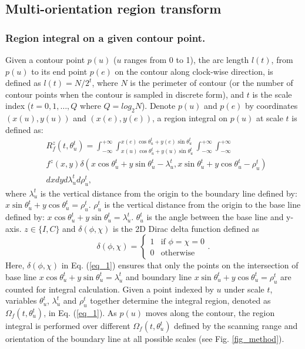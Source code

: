 \documentclass[letterpaper]{article} %
\begin{document}
\subsection{Multi-orientation region transform}
\subsubsection{Region integral on a given contour point.}
Given a contour point $p(u)$ ($u$ ranges from 0 to 1), the arc length $l(t)$, from $p(u)$ to its end point $p(e)$ on the contour along clock-wise direction, is defined as $l(t)=N/2^t$, where $N$ is the perimeter of contour (or the number of contour points when the contour is sampled in discrete form), and $t$ is the scale index ($t=0,1,\dots,Q$ where $Q=log_2 N$). Denote $p(u)$ and $p(e)$ by coordinates $(x(u),y(u))$ and $(x(e),y(e))$, a region integral on $p(u)$ at scale $t$ is defined as:
\begin{equation}
\begin{aligned}
& R_f^z (t,\theta_u^t) 
= \int_{-\infty}^{+\infty}\int_{x(u)\cos\theta_u^t+y(u)\sin\theta_u^t}^{x(e)\cos\theta_u^t+y(e)\sin\theta_u^t}\int_{-\infty}^{+\infty}\int_{-\infty}^{+\infty} \\ & f^z (x,y) \delta{(x\cos\theta_u^t+y\sin\theta_u^t-\lambda_u^t,x\sin\theta_u^t+y\cos\theta_u^t-\rho_u^t)} \\ & dxdyd\lambda_u^t d\rho_u^t,
\end{aligned}
\label{eq_1}
\end{equation}
where $ \lambda^t_u$ is the vertical distance from the origin to the boundary line defined by: $ x\sin \theta^t_u+y\cos \theta^t_u=\rho^t_u$. $\rho^t_u$ is the vertical distance from the origin to the base line defined by: $ x\cos \theta^t_u+y\sin \theta^t_u=\lambda^t_u$. $\theta^t_u$ is the angle between the base line and y-axis.  $z \in \{I,C\}$ and $\delta(\phi,\chi)$ is the 2D Dirac delta function defined as
\begin{equation}
\delta(\phi,\chi)=\begin{cases}
1& \text{if $\phi = \chi = 0 $}\\
0& \text{otherwise}
\end{cases}.
\label{eq_2}
\end{equation}
Here, $\delta(\phi,\chi)$ in Eq. (\ref{eq_1}) ensures that only the points on the intersection of base line $ x\cos \theta^t_u+y\sin \theta^t_u=\lambda^t_u$ and boundary line $ x\sin \theta^t_u+y\cos \theta^t_u=\rho^t_u$ are counted for integral calculation. Given a point indexed by $u$ under scale $t$, variables $\theta^t_u$, $\lambda^t_u$ and $\rho^t_u$ together determine the integral region, denoted as $\Omega_f (t,\theta_u^t )$, in Eq. (\ref{eq_1}). As $p(u)$ moves along the contour, the region integral is performed over different $\Omega_f (t,\theta_u^t )$ defined by the scanning range and orientation of the boundary line at all possible scales (see Fig. \ref{fig_method}).
\end{document}
